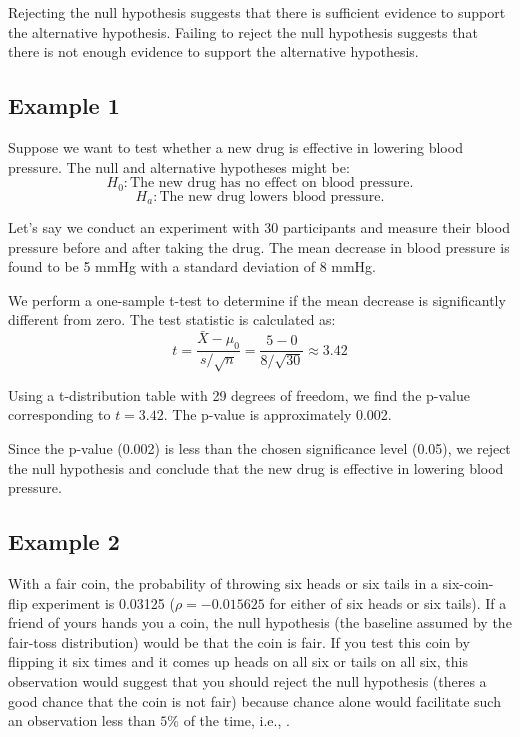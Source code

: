 \documentclass{article}
\begin{document}
Rejecting the null hypothesis suggests that there is sufficient evidence to support the alternative hypothesis. Failing to reject the null hypothesis suggests that there is not enough evidence to support the alternative hypothesis.

\subsection{Example 1}
Suppose we want to test whether a new drug is effective in lowering blood pressure. The null and alternative hypotheses might be:
\[
H_0: \text{The new drug has no effect on blood pressure.}
\]
\[
H_a: \text{The new drug lowers blood pressure.}
\]

Let's say we conduct an experiment with 30 participants and measure their blood pressure before and after taking the drug. The mean decrease in blood pressure is found to be 5 mmHg with a standard deviation of 8 mmHg.

We perform a one-sample t-test to determine if the mean decrease is significantly different from zero. The test statistic is calculated as:
\[
t = \frac{\bar{X} - \mu_0}{s / \sqrt{n}} = \frac{5 - 0}{8 / \sqrt{30}} \approx 3.42
\]

Using a t-distribution table with 29 degrees of freedom, we find the p-value corresponding to \(t = 3.42\). The p-value is approximately 0.002.

Since the p-value (0.002) is less than the chosen significance level (0.05), we reject the null hypothesis and conclude that the new drug is effective in lowering blood pressure.

\subsection{Example 2}
With a fair coin, the probability of throwing six heads or six tails in a six-coin-flip experiment is 0.03125 (\(\rho=-0.015625\) for either of six heads or six tails). 
If a friend of yours hands you a coin, the null hypothesis (the baseline assumed by the fair-toss distribution) would be that the coin is fair. 
If you test this coin by flipping it six times and it comes up heads on all six or tails on all six, this observation would suggest that you should reject the null hypothesis (theres a good chance that the coin is not fair) because chance alone would facilitate such an observation less than \(5\%\) of the time, i.e., 
.
\end{document}
